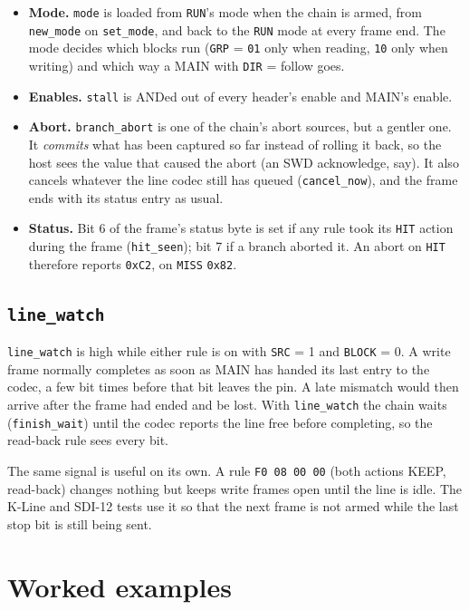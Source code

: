 \documentclass[11pt,a4paper]{article}
\newcommand{\sig}[1]{\texttt{#1}}
\begin{document}
\begin{itemize}
\item \textbf{Mode.} \sig{mode} is loaded from \sig{RUN}'s mode when the chain is armed, from \sig{new\_mode} on \sig{set\_mode}, and back to the \sig{RUN} mode at every frame end. The mode decides which blocks run (\sig{GRP} = \texttt{01} only when reading, \texttt{10} only when writing) and which way a MAIN with \sig{DIR} = follow goes.
\item \textbf{Enables.} \sig{stall} is ANDed out of every header's enable and MAIN's enable.
\item \textbf{Abort.} \sig{branch\_abort} is one of the chain's abort sources, but a gentler one. It \emph{commits} what has been captured so far instead of rolling it back, so the host sees the value that caused the abort (an SWD acknowledge, say). It also cancels whatever the line codec still has queued (\sig{cancel\_now}), and the frame ends with its status entry as usual.
\item \textbf{Status.} Bit 6 of the frame's status byte is set if any rule took its \sig{HIT} action during the frame (\sig{hit\_seen}); bit 7 if a branch aborted it. An abort on \sig{HIT} therefore reports \texttt{0xC2}, on \sig{MISS} \texttt{0x82}.
\end{itemize}

\subsection{\sig{line\_watch}}\label{sec:watch}

\sig{line\_watch} is high while either rule is on with \sig{SRC} = 1 and \sig{BLOCK} = 0. A write frame normally completes as soon as MAIN has handed its last entry to the codec, a few bit times before that bit leaves the pin. A late mismatch would then arrive after the frame had ended and be lost. With \sig{line\_watch} the chain waits (\sig{finish\_wait}) until the codec reports the line free before completing, so the read-back rule sees every bit.

The same signal is useful on its own. A rule \texttt{F0 08 00 00} (both actions KEEP, read-back) changes nothing but keeps write frames open until the line is idle. The K-Line and SDI-12 tests use it so that the next frame is not armed while the last stop bit is still being sent.

\section{Worked examples}
\end{document}
